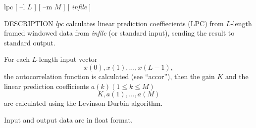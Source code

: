 % 
% 
% 
% 
%                                                                        
%
\hypertarget{lpc}{}

\begin{synopsis}
\item [lpc] [ --l $L$ ] [ --m $M$ ] [ {\em infile} ] 
\end{synopsis}

\begin{qsection}{DESCRIPTION}
{\em lpc} calculates linear prediction coeffiecients (LPC) 
from $L$-length framed windowed data from {\em infile} (or standard input), 
sending the result to standard output.

For each $L$-length input vector
\begin{displaymath}
  x(0),x(1),\ldots,x(L-1), 
\end{displaymath}
the autocorrelation function is calculated (see ``accor''),
then the gain $K$ and the linear prediction coefficients 
$a(k) (1 \leq k \leq M)$ 
\begin{displaymath}
  K, a(1), \ldots, a(M)
\end{displaymath}
are calculated using the Levinson-Durbin algorithm. 

Input and output data are in float format.
\end{qsection}

